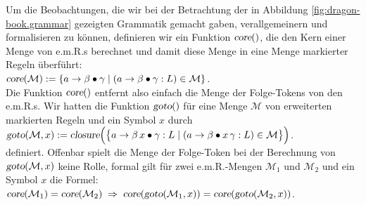 Um die Beobachtungen, die wir bei der Betrachtung der in Abbildung
\ref{fig:dragon-book.grammar} gezeigten Grammatik gemacht gaben, verallgemeinern und formalisieren zu
k\"onnen, definieren wir ein Funktion 
$\textsl{core}()$, die den Kern einer Menge von e.m.R.s berechnet und damit diese Menge in
eine Menge markierter Regeln \"uberf\"uhrt: 
\\[0.2cm]
\hspace*{1.3cm}
$\textsl{core}(\mathcal{M}) := 
   \{ a \rightarrow \beta \bullet \gamma \mid (a \rightarrow \beta \bullet \gamma:L) \in \mathcal{M} \}$. 
\\[0.2cm]
Die Funktion $\textsl{core}()$ entfernt also einfach die Menge der Folge-Tokens von den e.m.R.s.
Wir hatten die Funktion $\textsl{goto}()$ f\"ur eine Menge $\mathcal{M}$ von erweiterten
markierten Regeln und ein Symbol $x$ durch
\\[0.2cm]
\hspace*{1.3cm}
$\textsl{goto}(\mathcal{M}, x) := \textsl{closure}\Bigl( \bigl\{ 
 a \rightarrow \beta\, x \bullet \gamma:L \mid (a \rightarrow \beta \bullet x\, \gamma:L) \in \mathcal{M} 
 \bigr\} \Bigr)
$.
\\[0.2cm]
definiert.  Offenbar spielt die Menge der Folge-Token bei der Berechnung von
$\textsl{goto}(\mathcal{M}, x)$ keine Rolle, formal gilt f\"ur zwei e.m.R.-Mengen
$\mathcal{M}_1$ und $\mathcal{M}_2$ und ein Symbol $x$ die Formel:
\\[0.2cm]
\hspace*{1.3cm}
$\textsl{core}(\mathcal{M}_1) = \textsl{core}(\mathcal{M}_2) \;\Rightarrow\;
 \textsl{core}(\textsl{goto}(\mathcal{M}_1, x)) = 
 \textsl{core}(\textsl{goto}(\mathcal{M}_2, x))
$.
\vspace*{0.2cm}

